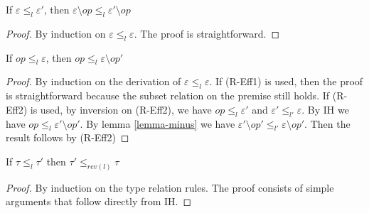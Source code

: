 \begin{lemma}
\label{lemma-minus}
If $\varepsilon \leq_l \varepsilon'$, then $\varepsilon \setminus op \leq_l \varepsilon' \setminus op$
\begin{proof}
By induction on $\varepsilon \leq_l \varepsilon$. The proof is straightforward.
\end{proof}

\end{lemma}

\begin{lemma}
\label{lemma-relation}
If $op \leq_{l} \varepsilon$, then $op \leq_{l} \varepsilon \setminus op'$
\begin{proof}
By induction on the derivation of $\varepsilon \leq_l \varepsilon$. If (R-Eff1) is used, then the proof is straightforward because the subset relation on the premise still holds. If (R-Eff2) is used, by inversion on (R-Eff2), we have $op \leq_l \varepsilon'$ and $\varepsilon' \leq_{l'} \varepsilon$. By IH we have $op \leq_l \varepsilon' \setminus op'$. By lemma \ref{lemma-minus} we have $\varepsilon'  \setminus op' \leq_{l'} \varepsilon \setminus op'$. Then the result follows by (R-Eff2)
\end{proof}
\end{lemma}

\begin{lemma}
\label{lemma-relation2}
If $\tau \leq_l \tau'$ then $\tau' \leq_{rev(l)} \tau$
\begin{proof}
By induction on the type relation rules. The proof consists of simple arguments that follow directly from IH.  
\end{proof}
\end{lemma}

